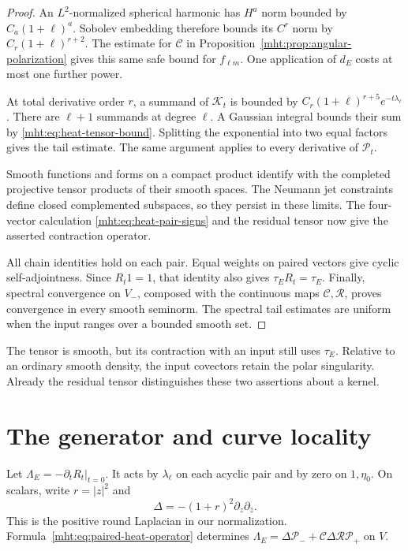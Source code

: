 \begin{proof}
An $L^2$-normalized spherical harmonic has $H^a$ norm bounded by
$C_a(1+\ell)^a$. Sobolev embedding therefore bounds its $C^r$
norm by $C_r(1+\ell)^{r+2}$. The estimate for $\mathcal C$ in
Proposition~\ref{mht:prop:angular-polarization} gives this same
safe bound for $f_{\ell m}$. One application of $d_E$ costs at
most one further power.

At total derivative order $r$, a summand of $\mathcal K_t$ is
bounded by $C_r(1+\ell)^{r+5}e^{-t\lambda_\ell}$. There are
$\ell+1$ summands at degree $\ell$. A Gaussian integral bounds
their sum by \eqref{mht:eq:heat-tensor-bound}. Splitting the
exponential into two equal factors gives the tail estimate.
The same argument applies to every derivative of $\mathcal P_t$.

Smooth functions and forms on a compact product identify with
the completed projective tensor products of their smooth spaces.
The Neumann jet constraints define closed complemented subspaces,
so they persist in these limits. The four-vector calculation
\eqref{mht:eq:heat-pair-signs} and the residual tensor now give
the asserted contraction operator.

All chain identities hold on each pair. Equal weights on paired
vectors give cyclic self-adjointness. Since $R_t1=1$, that identity
also gives $\tau_ER_t=\tau_E$. Finally, spectral convergence on
$V_-$, composed with the continuous maps $\mathcal C,\mathcal R$,
proves convergence in every smooth seminorm. The spectral tail
estimates are uniform when the input ranges over a bounded
smooth set.
\end{proof}

The tensor is smooth, but its contraction with an input still
uses $\tau_E$. Relative to an ordinary smooth density, the input
covectors retain the polar singularity. Already the residual
tensor distinguishes these two assertions about a kernel.

\section{The generator and curve locality}

Let $\Lambda_E=-\partial_tR_t|_{t=0}$. It acts by
$\lambda_\ell$ on each acyclic pair and by zero on $1,\eta_0$.
On scalars, write $r=|z|^2$ and
\[
 \Delta=-(1+r)^2\partial_z\partial_{\bar z}.
\]
This is the positive round Laplacian in our normalization.
Formula~\eqref{mht:eq:paired-heat-operator} determines
$\Lambda_E=\Delta\mathcal P_-+\mathcal C\Delta\mathcal R\mathcal P_+$
on $V$.

